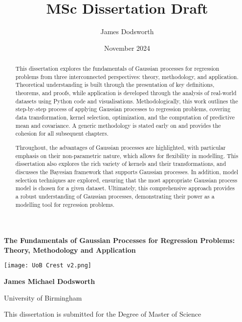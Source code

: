 \documentclass[12pt,a4paper]{article}
\title{MSc Dissertation Draft}
\author{James Dodsworth}
\date{November 2024}
\begin{document}
\begin{titlepage}
    \centering
    \vspace*{1cm} %
    
    \Huge
    \textbf{The Fundamentals of Gaussian Processes for Regression Problems: Theory, Methodology and Application}
    
    \vspace{1cm} %
    
    \texttt{[image: UoB Crest v2.png]} %
    
    \vspace{1cm} %
    
    \LARGE
    \textbf{James Michael Dodsworth}
    
    \vspace{0.5cm} %
    
    \Large
    University of Birmingham
    
    \vspace{1.5cm} %
    
    \Large
    This dissertation is submitted for the Degree of Master of Science
    
    \vfill %
\end{titlepage}
\begin{abstract}
This dissertation explores the fundamentals of Gaussian processes for regression problems from three interconnected perspectives: theory, methodology, and application. Theoretical understanding is built through the presentation of key definitions, theorems, and proofs, while application is developed through the analysis of real-world datasets using Python code and visualisations. Methodologically, this work outlines the step-by-step process of applying Gaussian processes to regression problems, covering data transformation, kernel selection, optimization, and the computation of predictive mean and covariance. A generic methodology is stated early on and provides the cohesion for all subsequent chapters.

Throughout, the advantages of Gaussian processes are highlighted, with particular emphasis on their non-parametric nature, which allows for flexibility in modelling. This dissertation also explores the rich variety of kernels and their transformations, and discusses the Bayesian framework that supports Gaussian processes. In addition, model selection techniques are explored, ensuring that the most appropriate Gaussian process model is chosen for a given dataset. Ultimately, this comprehensive approach provides a robust understanding of Gaussian processes, demonstrating their power as a modelling tool for regression problems.
    
\end{abstract}
\newpage
\end{document}
